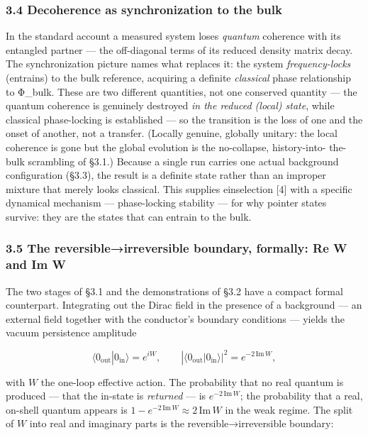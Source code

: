 \documentclass[
]{article}
\begin{document}
\subsubsection{3.4 Decoherence as synchronization to the
bulk}\label{decoherence-as-synchronization-to-the-bulk}

In the standard account a measured system loses \emph{quantum} coherence
with its entangled partner --- the off-diagonal terms of its reduced
density matrix decay. The synchronization picture names what replaces
it: the system \emph{frequency-locks} (entrains) to the bulk reference,
acquiring a definite \emph{classical} phase relationship to Φ\_bulk.
These are two different quantities, not one conserved quantity --- the
quantum coherence is genuinely destroyed \emph{in the reduced (local)
state}, while classical phase-locking is established --- so the
transition is the loss of one and the onset of another, not a transfer.
(Locally genuine, globally unitary: the local coherence is gone but the
global evolution is the no-collapse, history-into- the-bulk scrambling
of §3.1.) Because a single run carries one actual background
configuration (§3.3), the result is a definite state rather than an
improper mixture that merely looks classical. This supplies einselection
{[}4{]} with a specific dynamical mechanism --- phase-locking stability
--- for why pointer states survive: they are the states that can entrain
to the bulk.

\subsubsection{3.5 The reversible→irreversible boundary, formally: Re W
and Im
W}\label{the-reversibleirreversible-boundary-formally-re-w-and-im-w}

The two stages of §3.1 and the demonstrations of §3.2 have a compact
formal counterpart. Integrating out the Dirac field in the presence of a
background --- an external field together with the conductor's boundary
conditions --- yields the vacuum persistence amplitude

\[\langle 0_{\text{out}}|0_{\text{in}}\rangle = e^{iW}, \qquad |\langle 0_{\text{out}}|0_{\text{in}}\rangle|^2 = e^{-2\,\mathrm{Im}\,W},\]

with \(W\) the one-loop effective action. The probability that no real
quantum is produced --- that the in-state is \emph{returned} --- is
\(e^{-2\,\mathrm{Im}\,W}\); the probability that a real, on-shell
quantum appears is \(1-e^{-2\,\mathrm{Im}\,W}\approx 2\,\mathrm{Im}\,W\)
in the weak regime. The split of \(W\) into real and imaginary parts is
the reversible→irreversible boundary:
\end{document}
